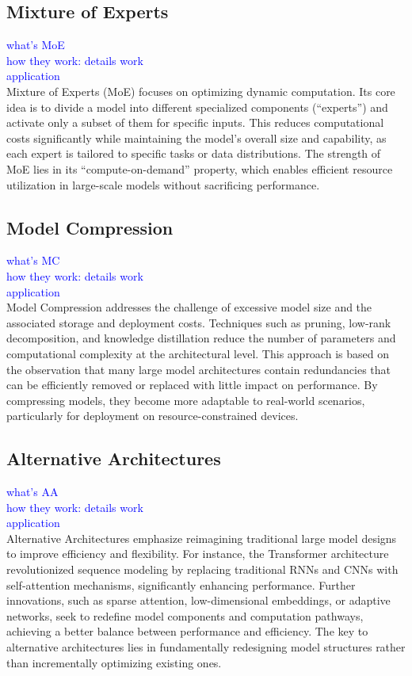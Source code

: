 \subsection{Mixture of Experts}
\textcolor{blue}{what's MoE}\\
\textcolor{blue}{how they work: details work}\\
\textcolor{blue}{application}\\
Mixture of Experts (MoE) focuses on optimizing dynamic computation. Its core idea is to divide a model into different specialized components (“experts”) and activate only a subset of them for specific inputs. This reduces computational costs significantly while maintaining the model’s overall size and capability, as each expert is tailored to specific tasks or data distributions. The strength of MoE lies in its “compute-on-demand” property, which enables efficient resource utilization in large-scale models without sacrificing performance.

\subsection{Model Compression}
\textcolor{blue}{what's MC}\\
\textcolor{blue}{how they work: details work}\\
\textcolor{blue}{application}\\
Model Compression addresses the challenge of excessive model size and the associated storage and deployment costs. Techniques such as pruning, low-rank decomposition, and knowledge distillation reduce the number of parameters and computational complexity at the architectural level. This approach is based on the observation that many large model architectures contain redundancies that can be efficiently removed or replaced with little impact on performance. By compressing models, they become more adaptable to real-world scenarios, particularly for deployment on resource-constrained devices.

\subsection{Alternative Architectures}
\textcolor{blue}{what's AA}\\
\textcolor{blue}{how they work: details work}\\
\textcolor{blue}{application}\\
Alternative Architectures emphasize reimagining traditional large model designs to improve efficiency and flexibility. For instance, the Transformer architecture revolutionized sequence modeling by replacing traditional RNNs and CNNs with self-attention mechanisms, significantly enhancing performance. Further innovations, such as sparse attention, low-dimensional embeddings, or adaptive networks, seek to redefine model components and computation pathways, achieving a better balance between performance and efficiency. The key to alternative architectures lies in fundamentally redesigning model structures rather than incrementally optimizing existing ones.

